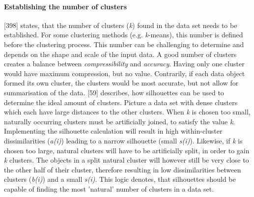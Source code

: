\paragraph{Establishing the number of clusters}
 \textcite{han2011data}[398] states, that the number of clusters (\textit{k}) found in the data set needs to be established. For some clustering methods (e.g. \textit{k}-means), this number is defined before the clustering process. This number can be challenging to determine and depends on the shape and scale of the input data. A good number of clusters creates a balance between \textit{compressibility} and \textit{accuracy}. Having only one cluster would have maximum compression, but no value. Contrarily, if each data object formed its own cluster, the clusters would be most accurate, but not allow for summarisation of the data. 
\textcite{rousseeuw1987silhouettes}[59] describes, how silhouettes can be used to determine the ideal amount of clusters. Picture a data set with dense clusters which each have large distances to the other clusters. When \textit{k} is chosen too small, naturally occurring clusters must be artificially joined, to satisfy the value \textit{k}. Implementing the silhouette calculation will result in high within-cluster dissimilarities (\textit{a(i)}) leading to a narrow silhouette (small \textit{s(i)}). Likewise, if \textit{k} is chosen too large, natural clusters will have to be artificially split, in order to gain \textit{k} clusters. The objects in a split natural cluster will however still be very close to the other half of their cluster, therefore resulting in low dissimilarities between clusters (\textit{b(i)}) and a small \textit{s(i)}.
This logic denotes, that silhouettes should be capable of finding the most 'natural' number of clusters in a data set.


  

